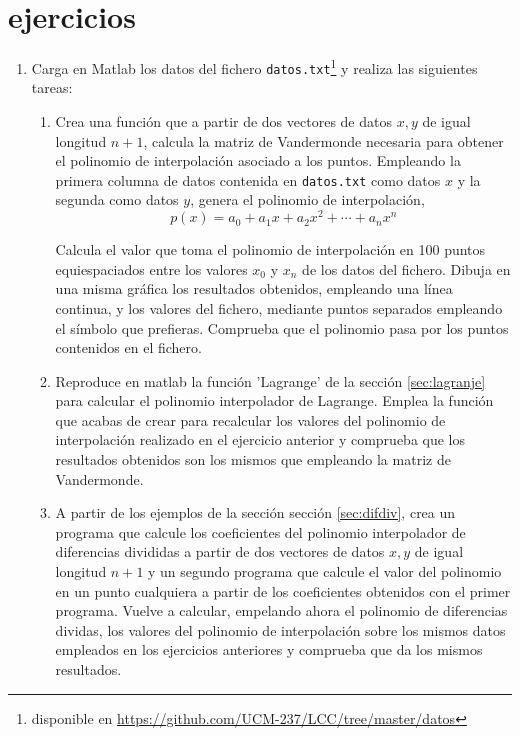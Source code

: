 \section{ejercicios}
\begin{enumerate}
\item Carga en Matlab los datos del fichero \texttt{datos.txt}\footnote{disponible en \url{https://github.com/UCM-237/LCC/tree/master/datos}} y realiza las siguientes tareas:
\begin{enumerate}
\item \label{ej1a} Crea una función que a partir de dos vectores de datos $x,y$ de igual longitud $n+1$, calcula la matriz de Vandermonde necesaria   para obtener el polinomio de interpolación asociado a los puntos. Empleando la primera columna de datos contenida en \texttt{datos.txt} como datos $x$ y la segunda como datos $y$, genera el polinomio de interpolación,
\begin{equation*}
p(x)=a_0+a_1x+a_2x^2+\cdots+a_nx^n
\end{equation*}

Calcula el valor que toma el polinomio de interpolación en 100 puntos equiespaciados entre los valores $x_0$ y $x_{n}$ de los datos del fichero. Dibuja en una misma gráfica los resultados obtenidos, empleando una línea continua, y los valores del fichero, mediante puntos separados empleando el símbolo que prefieras. Comprueba que el polinomio pasa por los puntos contenidos en el fichero.

\item Reproduce en matlab la función 'Lagrange' de la sección \ref{sec:lagranje} para calcular el polinomio interpolador de Lagrange. Emplea la función que acabas de crear para recalcular los valores del polinomio de interpolación realizado en el ejercicio anterior y comprueba que los resultados obtenidos son los mismos que empleando la matriz de Vandermonde.

\item A partir de los ejemplos de la sección  sección \ref{sec:difdiv}, crea un programa que calcule los coeficientes del polinomio interpolador de diferencias divididas a partir de dos vectores de datos  $x,y$ de igual longitud $n+1$ y un segundo programa que calcule el valor del polinomio en un punto cualquiera a partir de los coeficientes obtenidos con el primer programa. Vuelve a calcular, empelando ahora el polinomio de diferencias dividas, los valores del polinomio de interpolación sobre los mismos datos empleados en los ejercicios anteriores y comprueba que da los mismos resultados.


\end{enumerate}
\end{enumerate}
